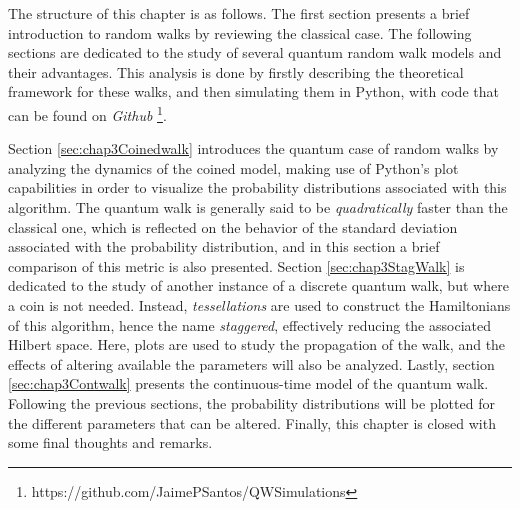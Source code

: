 \documentclass[../../dissertation.tex]{subfiles}
\begin{document}
The structure of this chapter is as follows. The first section presents a brief
introduction to random walks by reviewing the classical case. The following
sections are dedicated to the study of several quantum random walk models and
their advantages. This analysis is done by firstly describing the theoretical
framework for these walks, and then simulating them in Python, with code that
can be found on \textit{Github}
\footnote{https://github.com/JaimePSantos/QWSimulations}.\par 

Section \ref{sec:chap3Coinedwalk} introduces the quantum case of random walks
by analyzing the dynamics of the coined model, making use of Python's plot
capabilities in order to visualize the probability distributions associated
with this algorithm. The quantum walk is generally said to be
\textit{quadratically} faster than the classical one, which is reflected on the
behavior of the standard deviation associated with the probability
distribution, and in this section a brief comparison of this metric is also
presented.  Section \ref{sec:chap3StagWalk} is dedicated to the study of
another instance of a discrete quantum walk, but where a coin is not needed.
Instead, \textit{tessellations} are used to construct the Hamiltonians of this
algorithm, hence the name \textit{staggered}, effectively reducing the
associated Hilbert space. Here, plots are used to study the propagation of the
walk, and the effects of altering available the parameters will also be
analyzed.  Lastly, section \ref{sec:chap3Contwalk} presents the continuous-time
model of the quantum walk. Following the previous sections, the probability
distributions will be plotted for the different parameters that can be altered.
Finally, this chapter is closed with some final thoughts and remarks.
\end{document}
